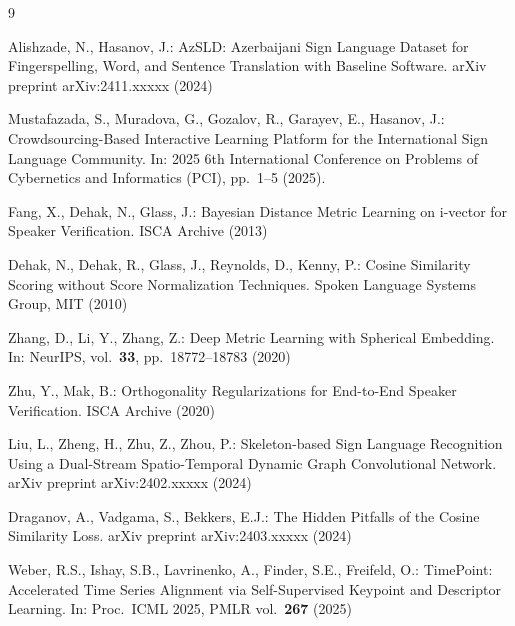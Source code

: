 \documentclass[runningheads]{llncs}
\begin{document}
%
% 
% 
%
\begin{thebibliography}{9}

Alishzade, N., Hasanov, J.:
AzSLD: Azerbaijani Sign Language Dataset for Fingerspelling, Word, and
Sentence Translation with Baseline Software.
arXiv preprint arXiv:2411.xxxxx (2024)

Mustafazada, S., Muradova, G., Gozalov, R., Garayev, E., Hasanov, J.:
Crowdsourcing-Based Interactive Learning Platform for the International
Sign Language Community.
In: 2025 6th International Conference on Problems of Cybernetics and
Informatics (PCI), pp.~1--5 (2025).

Fang, X., Dehak, N., Glass, J.:
Bayesian Distance Metric Learning on i-vector for Speaker Verification.
ISCA Archive (2013)

Dehak, N., Dehak, R., Glass, J., Reynolds, D., Kenny, P.:
Cosine Similarity Scoring without Score Normalization Techniques.
Spoken Language Systems Group, MIT (2010)

Zhang, D., Li, Y., Zhang, Z.:
Deep Metric Learning with Spherical Embedding.
In: NeurIPS, vol.~\textbf{33}, pp.~18772--18783 (2020)

Zhu, Y., Mak, B.:
Orthogonality Regularizations for End-to-End Speaker Verification.
ISCA Archive (2020)

Liu, L., Zheng, H., Zhu, Z., Zhou, P.:
Skeleton-based Sign Language Recognition Using a Dual-Stream
Spatio-Temporal Dynamic Graph Convolutional Network.
arXiv preprint arXiv:2402.xxxxx (2024)

Draganov, A., Vadgama, S., Bekkers, E.J.:
The Hidden Pitfalls of the Cosine Similarity Loss.
arXiv preprint arXiv:2403.xxxxx (2024)

Weber, R.S., Ishay, S.B., Lavrinenko, A., Finder, S.E., Freifeld, O.:
TimePoint: Accelerated Time Series Alignment via Self-Supervised Keypoint
and Descriptor Learning.
In: Proc.\ ICML 2025, PMLR vol.~\textbf{267} (2025)

\end{thebibliography}
\end{document}

